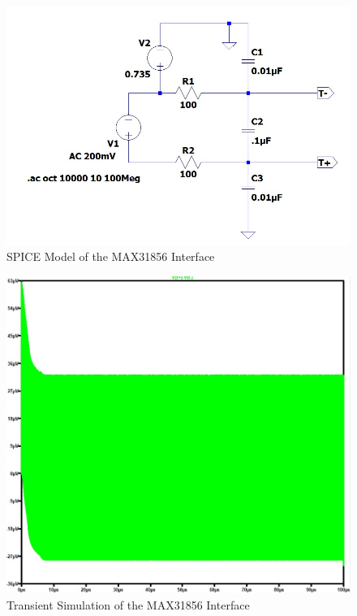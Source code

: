 \begin{figure}
    \centering
    \includegraphics[width=\linewidth]{pictures/SPICE.jpg}
    \caption{SPICE Model of the MAX31856 Interface}
    \label{fig:SPICE}
\end{figure}
\begin{figure}
    \centering
    \includegraphics[width=\linewidth]{pictures/Time-Plot.jpg}
    \caption{Transient Simulation of the MAX31856 Interface}
    \label{fig:SIM}
\end{figure}

